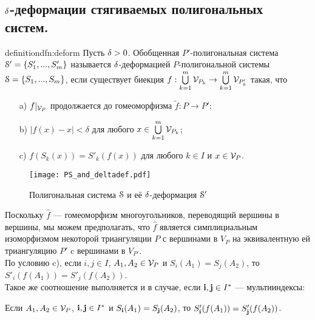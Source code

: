 \subsection{$\delta$-деформации стягиваемых полигональных систем.}
\begin{restatethis}{definition}{dfn:deform}\label{dfn:deform} 
Пусть $\delta>0$. Обобщенная $P'$-полигональная система ${\EuScript S}'=\{S'_1,...,S'_m\}$ называется $\delta$-деформацией $P$-полигональной системы ${\EuScript S}=\{S_1,...,S_m\}$, если существует биекция $f:\bigcup\limits_{k=1}^m {\mathcal V}_{P_k}\to \bigcup\limits_{k=1}^m {\mathcal V}_{P'_k}$ такая, что
\begin{itemize}[nolistsep]
    \item[a)] $f|_{{\mathcal V}_P}$ продолжается до гомеоморфизма $\tilde f: P\to  P'$;
    \item[b)] $|f(x)-x|<\delta$  для любого $x\in \bigcup\limits_{k=1}^m {\mathcal V}_{P_k}$;
    \item[c)] $f(S_k(x))=S'_k(f(x))$ для любого $k\in I$ и $x\in {\mathcal V}_P$.
\end{itemize}    
\end{restatethis}


\begin{figure}[H]
    \centering
    \texttt{[image: PS\_and\_deltadef.pdf]}
    \caption{Полигональная система ${\EuScript S}$ и её $\delta$-деформация ${\EuScript S}'$ }
    \label{img:ddef}
\end{figure}

Поскольку $\hat f$ --- гомеоморфизм многоугольников, переводящий вершины в вершины, мы можем предполагать, что $\hat f$ является симплициальным изоморфизмом некоторой триангуляции $P$ с вершинами в $V_P$ на эквивалентную ей триангуляцию $P'$ c вершинами в $V_{P'}$.\\ 
 
По условию c), если  $i,j\in I$, $A_1,A_2\in {\mathcal V}_P$ и $S_i(A_1)=S_j(A_2)$, то $S'_i( f(A_1))=S'_j(f(A_2))$.\\  Такое же соотношение выполняется и в случае, если ${\bf{i}},{\bf{j}}\in I^*$ --- мультииндексы:

\begin{lemma}\label{bibj}
Если $A_1,A_2\in {\mathcal V}_P$, ${\bf{i}},{\bf{j}}\in I^*$ и $S_{\bf{i}}(A_1)=S_{\bf{j}}(A_2)$, то $S'_{\bf{i}}( f(A_1))=S'_{\bf{j}}( f(A_2))$.
\end{lemma}
 
